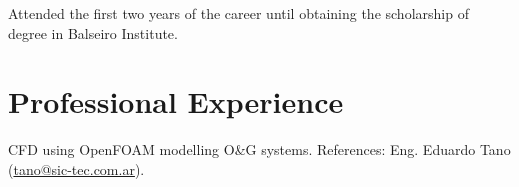 \documentclass[11pt,a4paper,sans]{moderncv}        %
\begin{document}
{Attended the first two years of the career until obtaining the scholarship of degree in Balseiro Institute.}




\section{Professional Experience}

{CFD using OpenFOAM modelling O&G systems.\newline{}
References: Eng. Eduardo Tano (\href{mailto:tano@sic-tec.com.ar}{tano@sic-tec.com.ar}).}
\end{document}
